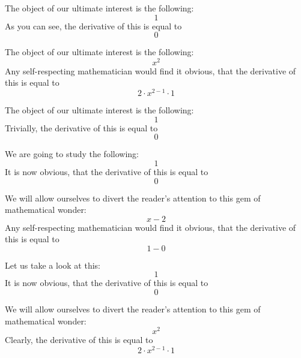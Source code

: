 \documentclass{article}
\begin{document}
The object of our ultimate interest is the following:
\begin{equation}
1 
\end{equation}
As you can see, the derivative of this is equal to
\begin{equation}
0 
\end{equation}

The object of our ultimate interest is the following:
\begin{equation}
x ^{2 } 
\end{equation}
Any self-respecting mathematician would find it obvious, that the derivative of this is equal to
\begin{equation}
2 \cdot x ^{2 - 1 } \cdot 1 
\end{equation}

The object of our ultimate interest is the following:
\begin{equation}
1 
\end{equation}
Trivially, the derivative of this is equal to
\begin{equation}
0 
\end{equation}

We are going to study the following:
\begin{equation}
1 
\end{equation}
It is now obvious, that the derivative of this is equal to
\begin{equation}
0 
\end{equation}

We will allow ourselves to divert the reader's attention to this gem of mathematical wonder:
\begin{equation}
x - 2 
\end{equation}
Any self-respecting mathematician would find it obvious, that the derivative of this is equal to
\begin{equation}
1 - 0 
\end{equation}

Let us take a look at this:
\begin{equation}
1 
\end{equation}
It is now obvious, that the derivative of this is equal to
\begin{equation}
0 
\end{equation}

We will allow ourselves to divert the reader's attention to this gem of mathematical wonder:
\begin{equation}
x ^{2 } 
\end{equation}
Clearly, the derivative of this is equal to
\begin{equation}
2 \cdot x ^{2 - 1 } \cdot 1 
\end{equation}
\end{document}
